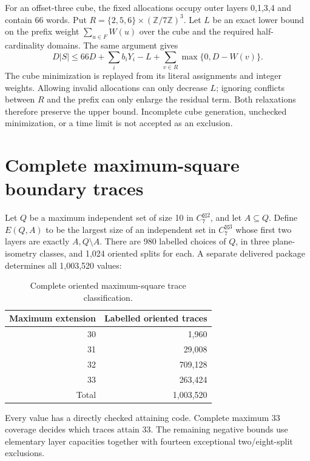 \documentclass[11pt]{article}
\theoremstyle{definition}
\newcommand{\Z}{\mathbb Z}
\newcommand{\G}[1]{C_7^{\boxtimes #1}}
\begin{document}
For an offset-three cube, the fixed allocations occupy outer layers 0,1,3,4
and contain 66 words. Put $R=\{2,5,6\}\times(\Z/7\Z)^3$.
Let $L$ be an exact lower bound on the prefix weight
$\sum_{u\in F}W(u)$ over the cube and the required half-cardinality
domains. The same argument gives
\begin{equation}\label{eq:cube}
 D|S|\leq66D+\sum_i b_iY_i-L+\sum_{v\in R}\max\{0,D-W(v)\}.
\end{equation}
The cube minimization is replayed from its literal assignments and
integer weights. Allowing invalid allocations can only decrease $L$;
ignoring conflicts between $R$ and the prefix can only enlarge the
residual term. Both relaxations therefore preserve the upper bound.
Incomplete cube generation, unchecked minimization, or a time limit is
not accepted as an exclusion.

\section{Complete maximum-square boundary traces}
Let $Q$ be a maximum independent set of size 10 in $\G2$, and let
$A\subseteq Q$. Define $E(Q,A)$ to be the largest size of an independent
set in $\G3$ whose first two layers are exactly $A,Q\setminus A$.
There are 980 labelled choices of $Q$, in three plane-isometry classes,
and 1,024 oriented splits for each. A separate delivered package determines
all 1,003,520 values:
\begin{table}[H]
\centering
\caption{Complete oriented maximum-square trace classification.}\label{tab:traces}
\begin{tabular}{rr}
\toprule Maximum extension & Labelled oriented traces\\\midrule
30 & 1,960\\31 & 29,008\\32 & 709,128\\33 & 263,424\\\midrule Total & 1,003,520\\\bottomrule
\end{tabular}
\end{table}
Every value has a directly checked attaining code. Complete maximum 33
coverage decides which traces attain 33. The remaining negative bounds
use elementary layer capacities together with fourteen exceptional
two/eight-split exclusions.
\end{document}
